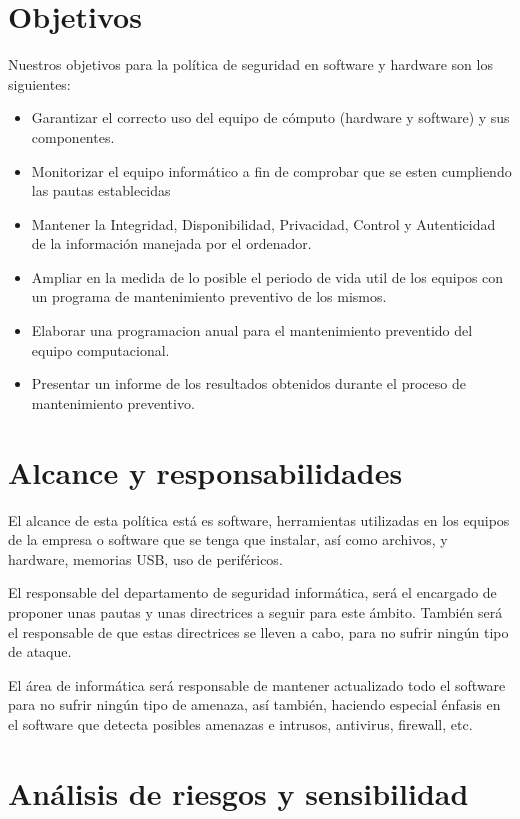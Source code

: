 \documentclass[11pt,bibtotoc,noliststotoc,BCOR0mm]{scrbook}
\begin{document}
\section{Objetivos}
Nuestros objetivos para la política de seguridad en software y hardware son los siguientes:
\begin{itemize}
\item Garantizar el correcto uso del equipo de cómputo (hardware y software) y sus componentes.
\item Monitorizar el equipo informático a fin de comprobar que se esten cumpliendo las pautas establecidas
\item Mantener la Integridad, Disponibilidad, Privacidad, Control y Autenticidad de la información manejada por el ordenador.
\item Ampliar en la medida de lo posible el periodo de vida util de los equipos con un programa de mantenimiento preventivo de los mismos.
\item Elaborar una programacion anual para el mantenimiento preventido del equipo computacional.
\item Presentar un informe de los resultados obtenidos durante el proceso de mantenimiento preventivo.
\end{itemize}


\section{Alcance y responsabilidades}

El alcance de esta política está es software, herramientas utilizadas en los equipos de la empresa o software que se tenga que instalar, así como archivos, y hardware, memorias USB, uso de periféricos.


El responsable del departamento de seguridad informática, será el encargado de proponer unas pautas y unas directrices a seguir para este ámbito. También será el responsable de que estas directrices se lleven a cabo, para no sufrir ningún tipo de ataque.


El área de informática será responsable de mantener actualizado todo el software para no sufrir ningún tipo de amenaza, así también, haciendo especial énfasis en el software que detecta posibles amenazas e intrusos, antivirus, firewall, etc.


\section{Análisis de riesgos y sensibilidad}
\end{document}
